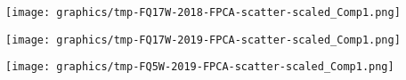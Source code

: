 \begin{center}
\texttt{[image: graphics/tmp-FQ17W-2018-FPCA-scatter-scaled\_Comp1.png]}
\end{center}

\begin{center}
\texttt{[image: graphics/tmp-FQ17W-2019-FPCA-scatter-scaled\_Comp1.png]}
\end{center}

\begin{center}
\texttt{[image: graphics/tmp-FQ5W-2019-FPCA-scatter-scaled\_Comp1.png]}
\end{center}




\renewcommand{\theenumi}{\roman{enumi}}
\renewcommand{\labelenumi}{\textnormal{(\theenumi)}$\;\;$}

